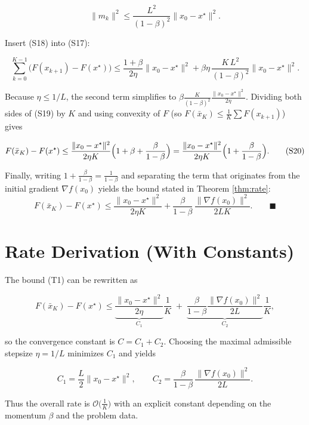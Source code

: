\documentclass{article}
\newcommand{\grad}{\nabla}
\begin{document}
\[
\|m_k\|^{2}\le \frac{L^{2}}{(1-\beta)^{2}}\|x_0-x^\star\|^{2}.
\tag{S18}
\]

Insert (S18) into (S17):

\[
\sum_{k=0}^{K-1}\bigl(F(x_{k+1})-F(x^\star)\bigr)
\le \frac{1+\beta}{2\eta}\|x_0-x^\star\|^{2}
+\beta\eta\,\frac{K\,L^{2}}{(1-\beta)^{2}}\|x_0-x^\star\|^{2}.
\tag{S19}
\]

Because $\eta\le 1/L$, the second term simplifies to
$\displaystyle \beta\frac{K}{(1-\beta)^{2}}\frac{\|x_0-x^\star\|^{2}}{2\eta}$.
Dividing both sides of (S19) by $K$ and using convexity of $F$ (so $F(\bar{x}_K)\le\frac1K\sum F(x_{k+1})$) gives

\[
F(\bar{x}_K)-F(x^\star)
\le \frac{\|x_0-x^\star\|^{2}}{2\eta K}
\Bigl(1+\beta+\frac{\beta}{1-\beta}\Bigr)
= \frac{\|x_0-x^\star\|^{2}}{2\eta K}
\Bigl(1+\frac{\beta}{1-\beta}\Bigr).
\tag{S20}
\]

Finally, writing $1+\frac{\beta}{1-\beta}= \frac{1}{1-\beta}$ and separating the term that
originates from the initial gradient $\grad f(x_0)$ yields the bound stated in
Theorem \ref{thm:rate}:
\[
F(\bar{x}_K)-F(x^\star)
\le \frac{\|x_0-x^\star\|^{2}}{2\eta K}
+\frac{\beta}{1-\beta}\,\frac{\|\grad f(x_0)\|^{2}}{2L K}.
\qquad\blacksquare
\]

\section*{Rate Derivation (With Constants)}
The bound (T1) can be rewritten as

\[
F(\bar{x}_K)-F(x^\star)
\le \underbrace{\frac{\|x_0-x^\star\|^{2}}{2\eta}}_{C_1}\frac{1}{K}
\;+\;
\underbrace{\frac{\beta}{1-\beta}\frac{\|\grad f(x_0)\|^{2}}{2L}}_{C_2}\frac{1}{K},
\]

so the convergence constant is $C=C_1+C_2$.  Choosing the maximal admissible stepsize
$\eta=1/L$ minimizes $C_1$ and yields

\[
C_1 = \frac{L}{2}\|x_0-x^\star\|^{2},\qquad
C_2 = \frac{\beta}{1-\beta}\,\frac{\|\grad f(x_0)\|^{2}}{2L}.
\]

Thus the overall rate is $\mathcal O\!\bigl(\frac{1}{K}\bigr)$ with an explicit constant
depending on the momentum $\beta$ and the problem data.
\end{document}

